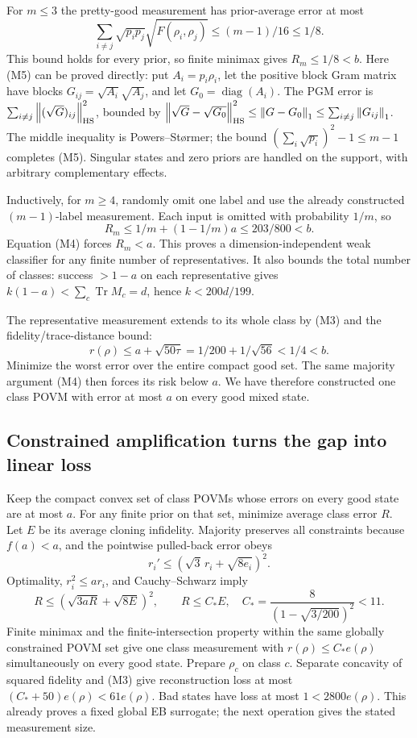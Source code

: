 \documentclass[11pt]{article}
\newcommand{\Tr}{\operatorname{Tr}}
\newcommand{\norm}[1]{\left\lVert#1\right\rVert}
\begin{document}
For $m\le3$ the pretty-good measurement has prior-average error at most
\[
\sum_{i\ne j}\sqrt{p_ip_j}\sqrt{F(\rho_i,\rho_j)}
\le(m-1)/16\le1/8.
\tag{M5}
\]
This bound holds for every prior, so finite minimax gives $R_m\le1/8<b$. Here (M5) can be proved directly: put $A_i=p_i\rho_i$, let the positive block Gram matrix have blocks $G_{ij}=\sqrt{A_i}\sqrt{A_j}$, and let $G_0=\operatorname{diag}(A_i)$. The PGM error is $\sum_{i\ne j}\norm{(\sqrt G)_{ij}}_{\rm HS}^2$, bounded by $\norm{\sqrt G-\sqrt{G_0}}_{\rm HS}^2\le\norm{G-G_0}_1\le\sum_{i\ne j}\norm{G_{ij}}_1$. The middle inequality is Powers--St\o rmer; the bound $(\sum_i\sqrt{p_i})^2-1\le m-1$ completes (M5). Singular states and zero priors are handled on the support, with arbitrary complementary effects.

Inductively, for $m\ge4$, randomly omit one label and use the already constructed $(m-1)$-label measurement. Each input is omitted with probability $1/m$, so
\[
R_m\le1/m+(1-1/m)a\le203/800<b.
\tag{M6}
\]
Equation (M4) forces $R_m<a$. This proves a dimension-independent weak classifier for any finite number of representatives. It also bounds the total number of classes: success $>1-a$ on each representative gives $k(1-a)<\sum_c\Tr M_c=d$, hence $k<200d/199$.

The representative measurement extends to its whole class by (M3) and the fidelity/trace-distance bound:
\[
r(\rho)\le a+\sqrt{50\tau}=1/200+1/\sqrt{56}<1/4<b.
\]
Minimize the worst error over the entire compact good set. The same majority argument (M4) then forces its risk below $a$. We have therefore constructed one class POVM with error at most $a$ on every good mixed state.

\subsection{Constrained amplification turns the gap into linear loss}

Keep the compact convex set of class POVMs whose errors on every good state are at most $a$. For any finite prior on that set, minimize average class error $R$. Let $E$ be its average cloning infidelity. Majority preserves all constraints because $f(a)<a$, and the pointwise pulled-back error obeys
\[
r_i'\le(\sqrt3\,r_i+\sqrt{8e_i})^2.
\]
Optimality, $r_i^2\le ar_i$, and Cauchy--Schwarz imply
\[
R\le(\sqrt{3aR}+\sqrt{8E})^2,
\qquad R\le C_*E,\quad C_*=\frac8{(1-\sqrt{3/200})^2}<11.
\tag{M7}
\]
Finite minimax and the finite-intersection property within the same globally constrained POVM set give one class measurement with $r(\rho)\le C_*e(\rho)$ simultaneously on every good state. Prepare $\rho_c$ on class $c$. Separate concavity of squared fidelity and (M3) give reconstruction loss at most $(C_*+50)e(\rho)<61e(\rho)$. Bad states have loss at most $1<2800e(\rho)$. This already proves a fixed global EB surrogate; the next operation gives the stated measurement size.
\end{document}
